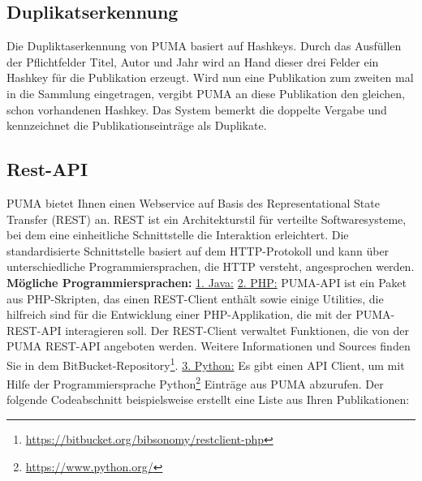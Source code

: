 \subsection{Duplikatserkennung} 
Die Dupliktaserkennung von PUMA basiert auf Hashkeys. Durch das Ausfüllen der Pflichtfelder Titel, Autor und Jahr wird an Hand dieser drei Felder ein Hashkey für die Publikation erzeugt. Wird nun eine Publikation zum zweiten mal in die Sammlung eingetragen, vergibt PUMA an diese Publikation den gleichen, schon vorhandenen Hashkey. Das System bemerkt die doppelte Vergabe und kennzeichnet die Publikationseinträge als Duplikate. 


\subsection{Rest-API}
PUMA bietet Ihnen einen Webservice auf Basis des Representational State Transfer (REST) an. \newline
REST ist ein Architekturstil für verteilte Softwaresysteme, bei dem eine einheitliche Schnittstelle die Interaktion erleichtert. Die standardisierte Schnittstelle basiert auf dem HTTP-Protokoll und kann über unterschiedliche Programmiersprachen, die HTTP versteht, angesprochen werden.\newline\newline
\textbf{Mögliche Programmiersprachen:}\newline\newline
\underline{1. Java:}   \newline\newline 
\underline{2. PHP:}\newline
PUMA-API ist ein Paket aus PHP-Skripten, das einen REST-Client enthält sowie einige Utilities, die hilfreich sind für die Entwicklung einer PHP-Applikation, die mit der PUMA-REST-API interagieren soll. Der REST-Client verwaltet Funktionen, die von der PUMA REST-API angeboten werden.
\newline
Weitere Informationen und Sources finden Sie in dem BitBucket-Repository\footnote{\url{https://bitbucket.org/bibsonomy/restclient-php}}.  
\newline\newline
\underline{3. Python:}\newline
Es gibt einen API Client, um mit Hilfe der Programmiersprache Python\footnote{\url{https://www.python.org/}} Einträge aus PUMA abzurufen. Der folgende Codeabschnitt beispielsweise erstellt eine Liste aus Ihren Publikationen:\newline\newline
